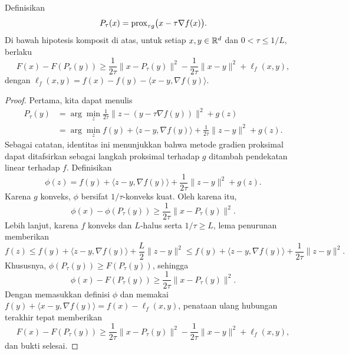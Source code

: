 \begin{lemma}
    Definisikan
    \begin{equation}
        P_\tau(x)=\mathrm{prox}_{\tau g}\bigl(x-\tau\nabla f(x)\bigr).
    \end{equation}
    Di bawah hipotesis komposit di atas, untuk setiap \(x,y\in\mathbb{R}^d\) dan \(0<\tau\leq1/L\), berlaku
    \begin{equation}
        F(x)-F(P_\tau(y))
        \geq\frac{1}{2\tau}\|x-P_\tau(y)\|^2
        -\frac{1}{2\tau}\|x-y\|^2+\ell_f(x,y),
    \end{equation}
    dengan \(\ell_f(x,y)=f(x)-f(y)-\langle x-y,\nabla f(y)\rangle\).
\end{lemma}
\begin{proof}
    Pertama, kita dapat menulis
    \begin{equation}
        \begin{aligned}
            P_\tau(y)
            &=\arg\min_z
            \frac{1}{2\tau}\|z-(y-\tau\nabla f(y))\|^2+g(z)\\
            &=\arg\min_z
            f(y)+\langle z-y,\nabla f(y)\rangle
            +\frac{1}{2\tau}\|z-y\|^2+g(z).
        \end{aligned}
    \end{equation}
    Sebagai catatan, identitas ini menunjukkan bahwa metode gradien proksimal dapat ditafsirkan sebagai langkah proksimal terhadap \(g\) ditambah pendekatan linear terhadap \(f\). Definisikan
    \begin{equation}
        \phi(z)=f(y)+\langle z-y,\nabla f(y)\rangle
        +\frac{1}{2\tau}\|z-y\|^2+g(z).
    \end{equation}
    Karena \(g\) konveks, \(\phi\) bersifat \(1/\tau\)-konveks kuat. Oleh karena itu,
    \begin{equation}
        \phi(x)-\phi(P_\tau(y))
        \geq\frac{1}{2\tau}\|x-P_\tau(y)\|^2.
    \end{equation}
    Lebih lanjut, karena \(f\) konveks dan \(L\)-halus serta \(1/\tau\geq L\), lema penurunan memberikan
    \begin{equation}
        f(z)\leq f(y)+\langle z-y,\nabla f(y)\rangle
        +\frac{L}{2}\|z-y\|^2
        \leq f(y)+\langle z-y,\nabla f(y)\rangle
        +\frac{1}{2\tau}\|z-y\|^2.
    \end{equation}
    Khususnya, \(\phi(P_\tau(y))\geq F(P_\tau(y))\), sehingga
    \begin{equation}
        \phi(x)-F(P_\tau(y))
        \geq\frac{1}{2\tau}\|x-P_\tau(y)\|^2.
    \end{equation}
    Dengan memasukkan definisi \(\phi\) dan memakai
    \(f(y)+\langle x-y,\nabla f(y)\rangle=f(x)-\ell_f(x,y)\),
    penataan ulang hubungan terakhir tepat memberikan
    \begin{equation}
        F(x)-F(P_\tau(y))
        \geq\frac{1}{2\tau}\|x-P_\tau(y)\|^2
        -\frac{1}{2\tau}\|x-y\|^2+\ell_f(x,y),
    \end{equation}
    dan bukti selesai.
\end{proof}

